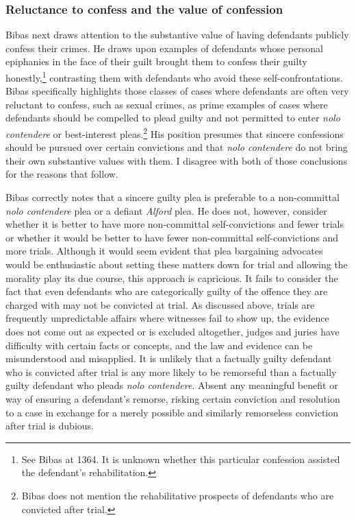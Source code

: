\subsubsection{Reluctance to confess and the value of confession}

Bibas next draws attention to the substantive value of having defendants publicly confess their crimes. He draws upon examples of defendants whose personal epiphanies in the face of their guilt brought them to confess their guilty honestly,\footnote{See Bibas at 1364. It is unknown whether this particular confession assisted the defendant's rehabilitation.} contrasting them with defendants who avoid these self-confrontations. Bibas specifically highlights those classes of cases where defendants are often very reluctant to confess, such as sexual crimes, as prime examples of cases where defendants should be compelled to plead guilty and not permitted to enter \textit{nolo contendere} or best-interest pleas.\footnote{Bibas does not mention the rehabilitative prospects of defendants who are convicted after trial.} His position presumes that sincere confessions should be pursued over certain convictions and that \textit{nolo contendere} do not bring their own substantive values with them. I disagree with both of those conclusions for the reasons that follow.

Bibas correctly notes that a sincere guilty plea is preferable to a non-committal \textit{nolo contendere} plea or a defiant \textit{Alford} plea. He does not, however, consider whether it is better to have more non-committal self-convictions and fewer trials or whether it would be better to have fewer non-committal self-convictions and more trials. Although it would seem evident that plea bargaining advocates would be enthusiastic about setting these matters down for trial and allowing the morality play its due course, this approach is capricious. It fails to consider the fact that even defendants who are categorically guilty of the offence they are charged with may not be convicted at trial. As discussed above, trials are frequently unpredictable affairs where witnesses fail to show up, the evidence does not come out as expected or is excluded altogether, judges and juries have difficulty with certain facts or concepts, and the law and evidence can be misunderstood and misapplied. It is unlikely that a factually guilty defendant who is convicted after trial is any more likely to be remorseful than a factually guilty defendant who pleads \textit{nolo contendere}. Absent any meaningful benefit or way of ensuring a defendant's remorse, risking certain conviction and resolution to a case in exchange for a merely possible and similarly remorseless conviction after trial is dubious. 

